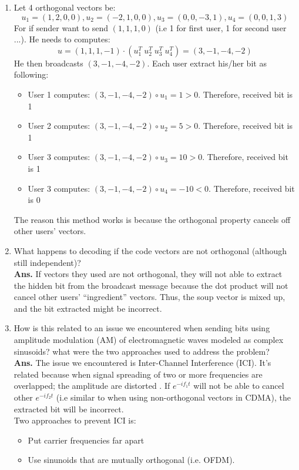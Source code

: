 \documentclass[12pt]{article}
\newenvironment{problem}[2][Problem]{\begin{trivlist}
\item[\hskip \labelsep {\bfseries #1}\hskip \labelsep {\bfseries #2.}]}{\end{trivlist}}
\begin{document}
\begin{problem}{2}
\end{problem}
\begin{enumerate}
\item Let 4 orthogonal vectors be:
$$u_1= (1,2,0,0), u_2= (-2,1,0,0), u_3 = (0,0 ,-3,1), u_4=(0,0 ,1,3)$$
For if sender want to send $(1,1,1,0)$ (i.e 1 for first user, 1 for second user ...). He needs to computes: \\
$$u = (1,1,1,-1) \cdot (u_1^T\ u_2^T\ u_3^T\ u_4^T) = (3,-1,-4,-2)$$
He then broadcasts $(3,-1,-4,-2)$. Each user extract his/her bit as following:
\begin{itemize}
	\item User 1 computes: $(3,-1,-4,-2) \circ u_1 = 1 > 0$. Therefore, received bit is 1 
	\item User 2 computes: $(3,-1,-4,-2) \circ u_2 = 5 > 0$. Therefore, received bit is 1 
	\item User 3 computes: $(3,-1,-4,-2) \circ u_3 = 10 > 0$. Therefore, received bit is 1 
	\item User 3 computes: $(3,-1,-4,-2) \circ u_4 = -10 < 0$. Therefore, received bit is 0 
\end{itemize}
The reason this method works is because the orthogonal property cancels off other users' vectors.
\item What happens to decoding if the code vectors are not orthogonal (although still independent)?\\
 \textbf{Ans.} If vectors they used are not orthogonal, they will not able to extract the hidden bit from the broadcast message because the dot product will not cancel other users' ``ingredient'' vectors. Thus, the soup vector is mixed up, and the bit extracted might be incorrect.
\item How is this related to an issue we encountered when sending bits using amplitude modulation (AM) of electromagnetic waves modeled
as complex sinusoids? what were the two approaches used to address the problem? \\
\textbf{Ans.}
The issue we encountered is Inter-Channel Interference (ICI). It's related because when signal spreading of two or more frequencies are overlapped; the amplitude are distorted . If $e^{-if_1t}$ will not be able to cancel other $e^{-if_2t}$ (i.e similar to when using non-orthogonal vectors in CDMA), the extracted bit will be incorrect. 
\\
Two approaches to prevent ICI is:
\begin{itemize}
	\item Put carrier frequencies far apart
	\item Use sinunoids that are mutually orthogonal (i.e. OFDM). 
\end{itemize}
\end{enumerate}
\end{document}
